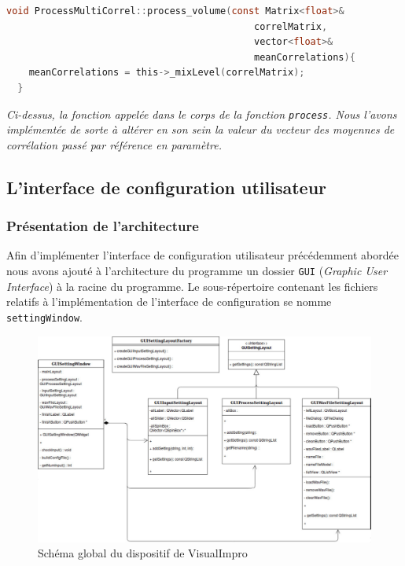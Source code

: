  \begin{lstlisting}[language=C, frame=single, breaklines=true]
  void ProcessMultiCorrel::process_volume(const Matrix<float>&
                                            correlMatrix,
                                            vector<float>&
                                            meanCorrelations){
    meanCorrelations = this->_mixLevel(correlMatrix);
  }
 \end{lstlisting}
 \begin{center}
  \textit{Ci-dessus, la fonction appelée dans le corps de la fonction \verb!process!. Nous l'avons implémentée de sorte à altérer en son sein la valeur du vecteur des moyennes de corrélation passé par référence en paramètre.}
 \end{center}

 \subsection{L'interface de configuration utilisateur}
 \paragraph{}

 \subsubsection{Présentation de l'architecture}
 Afin d'implémenter l'interface de configuration utilisateur
 précédemment abordée nous avons ajouté à l'architecture du programme
 un dossier \verb!GUI! (\textit{Graphic User Interface}) à la racine
 du programme.  Le sous-répertoire contenant les fichiers relatifs à
 l'implémentation de l'interface de configuration se nomme
 \verb!settingWindow!.

 \begin{figure}[h]
  \centering
  \includegraphics[scale=0.3]{assets/umlSettingWindow.png}
  \caption{Schéma global du dispositif de VisualImpro}
  \label{schéma global}
 \end{figure}

